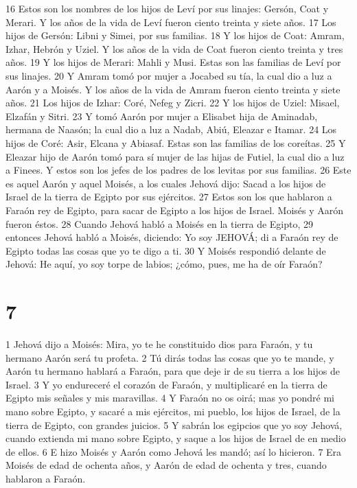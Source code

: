 16 Estos son los nombres de los hijos de Leví por sus linajes: Gersón, Coat y Merari. Y los años de la vida de Leví fueron ciento treinta y siete años.
17 Los hijos de Gersón: Libni y Simei, por sus familias.
18 Y los hijos de Coat: Amram, Izhar, Hebrón y Uziel. Y los años de la vida de Coat fueron ciento treinta y tres años.
19 Y los hijos de Merari: Mahli y Musi. Estas son las familias de Leví por sus linajes.
20 Y Amram tomó por mujer a Jocabed su tía, la cual dio a luz a Aarón y a Moisés. Y los años de la vida de Amram fueron ciento treinta y siete años.
21 Los hijos de Izhar: Coré, Nefeg y Zicri.
22 Y los hijos de Uziel: Misael, Elzafán y Sitri.
23 Y tomó Aarón por mujer a Elisabet hija de Aminadab, hermana de Naasón; la cual dio a luz a Nadab, Abiú, Eleazar e Itamar.
24 Los hijos de Coré: Asir, Elcana y Abiasaf. Estas son las familias de los coreítas.
25 Y Eleazar hijo de Aarón tomó para sí mujer de las hijas de Futiel, la cual dio a luz a Finees. Y estos son los jefes de los padres de los levitas por sus familias.
26 Este es aquel Aarón y aquel Moisés, a los cuales Jehová dijo: Sacad a los hijos de Israel de la tierra de Egipto por sus ejércitos.
27 Estos son los que hablaron a Faraón rey de Egipto, para sacar de Egipto a los hijos de Israel. Moisés y Aarón fueron éstos.
28 Cuando Jehová habló a Moisés en la tierra de Egipto,
29 entonces Jehová habló a Moisés, diciendo: Yo soy JEHOVÁ; di a Faraón rey de Egipto todas las cosas que yo te digo a ti.
30 Y Moisés respondió delante de Jehová: He aquí, yo soy torpe de labios; ¿cómo, pues, me ha de oír Faraón?

\chapter{7}
1 Jehová dijo a Moisés: Mira, yo te he constituido dios para Faraón, y tu hermano Aarón será tu profeta.
2 Tú dirás todas las cosas que yo te mande, y Aarón tu hermano hablará a Faraón, para que deje ir de su tierra a los hijos de Israel.
3 Y yo endureceré el corazón de Faraón, y multiplicaré en la tierra de Egipto mis señales y mis maravillas.
4 Y Faraón no os oirá; mas yo pondré mi mano sobre Egipto, y sacaré a mis ejércitos, mi pueblo, los hijos de Israel, de la tierra de Egipto, con grandes juicios.
5 Y sabrán los egipcios que yo soy Jehová, cuando extienda mi mano sobre Egipto, y saque a los hijos de Israel de en medio de ellos.
6 E hizo Moisés y Aarón como Jehová les mandó; así lo hicieron.
7 Era Moisés de edad de ochenta años, y Aarón de edad de ochenta y tres, cuando hablaron a Faraón.

